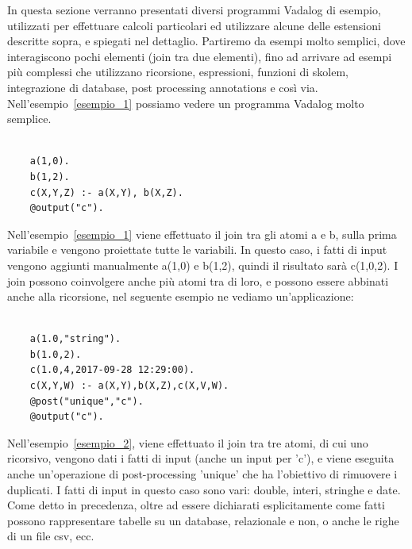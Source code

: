 In questa sezione verranno presentati diversi programmi Vadalog di esempio, utilizzati per effettuare calcoli particolari ed utilizzare alcune delle estensioni descritte sopra, e spiegati nel dettaglio. \newline
Partiremo da esempi molto semplici, dove interagiscono pochi elementi (join tra due elementi), fino ad arrivare ad esempi più complessi che utilizzano ricorsione, espressioni, funzioni di skolem, integrazione di database, post processing annotations e così via. \newline
Nell'esempio~\ref{esempio_1} possiamo vedere un programma Vadalog molto semplice.
\begin{example}\label{esempio_1}
\normalfont
{}
\begin{lstlisting}

	a(1,0). 
	b(1,2). 
	c(X,Y,Z) :- a(X,Y), b(X,Z). 
	@output("c").
\end{lstlisting}
\end{example}
Nell'esempio~\ref{esempio_1} viene effettuato il join tra gli atomi a e b, sulla prima variabile e vengono proiettate tutte le variabili. In questo caso, i fatti di input vengono aggiunti manualmente a(1,0) e b(1,2), quindi il risultato sarà c(1,0,2). \newline
I join possono coinvolgere anche più atomi tra di loro, e possono essere abbinati anche alla ricorsione, nel seguente esempio ne vediamo un'applicazione:
\begin{example}\label{esempio_2}
\normalfont
{}
\begin{lstlisting}

	a(1.0,"string"). 
	b(1.0,2). 
	c(1.0,4,2017-09-28 12:29:00). 
	c(X,Y,W) :- a(X,Y),b(X,Z),c(X,V,W). 
	@post("unique","c"). 
	@output("c").
\end{lstlisting}
\end{example} 
Nell'esempio~\ref{esempio_2}, viene effettuato il join tra tre atomi, di cui uno ricorsivo, vengono dati i fatti di input (anche un input per 'c'), e viene eseguita anche un'operazione di post-processing 'unique' che ha l'obiettivo di rimuovere i duplicati. \newline
I fatti di input in questo caso sono vari: double, interi, stringhe e date. Come detto in precedenza, oltre ad essere dichiarati esplicitamente come fatti possono rappresentare tabelle su un database, relazionale e non, o anche le righe di un file csv, ecc. \newline
